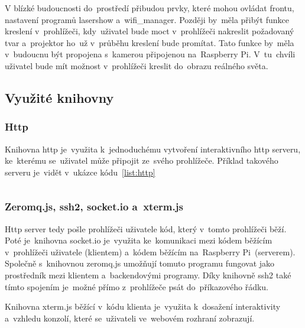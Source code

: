 
V blízké budoucnosti do~prostředí přibudou prvky, které mohou ovládat frontu, nastavení programů lasershow a~wifi\_manager. Později by~měla přibýt funkce kreslení v~prohlížeči, kdy~uživatel bude moct v~prohlížeči nakreslit požadovaný tvar a~projektor ho~už v~průběhu kreslení bude promítat. Tato funkce by~měla v~budoucnu být propojena s~kamerou připojenou na~Raspberry Pi. V~tu~chvíli uživatel bude mít možnost v~prohlížeči kreslit do~obrazu reálného světa.

\subsection{Využité knihovny}
\subsubsection{Http}
Knihovna http je~využita k~jednoduchému vytvoření interaktivního http serveru, ke~kterému se~uživatel může připojit ze~svého prohlížeče. Příklad takového serveru je~vidět v~ukázce kódu~\ref{list:http}
\begin{code}
    \inputminted[frame=lines,fontsize=\footnotesize{}, linenos, breaklines]{js}{code_examples/http_static_files.js}
\end{code}
    
\subsubsection{Zeromq.js, ssh2, socket.io a~xterm.js}
Http server tedy pošle prohlížeči uživatele kód, který v~tomto prohlížeči běží. Poté je~knihovna socket.io je~využita ke~komunikaci mezi kódem běžícím v~prohlížeči uživatele (klientem) a~kódem běžícím na~Raspberry Pi~(serverem).
Společně s~knihovnou zeromq.js umožňují tomuto programu fungovat jako prostředník mezi klientem a~backendovými programy. Díky knihovně ssh2 také tímto spojením je~možné přímo z~prohlížeče psát do~příkazového řádku.

Knihovna xterm.js běžící v~kódu klienta je~využita k~dosažení interaktivity a~vzhledu konzolí, které se~uživateli ve~webovém rozhraní zobrazují.

